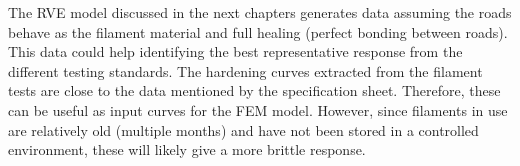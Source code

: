 The RVE model discussed in the next chapters generates data assuming the roads behave as the filament material and full healing (perfect bonding between roads). This data could help identifying the best representative response from the different testing standards.
The hardening curves extracted from the filament tests are close to the data mentioned by the specification sheet. Therefore, these can be useful as input curves for the FEM model. However, since filaments in use are relatively old (multiple months) and have not been stored in a controlled environment, these will likely give a more brittle response. 

